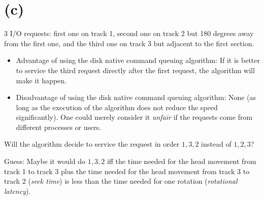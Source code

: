 \documentclass{article}
\begin{document}
\section*{(c)}
3 I/O requests: first one on track 1, second one on track 2 but 180 degrees away from the first one, and the third one on track 3 but adjacent to the first section.
\begin{itemize}
\item Advantage of using the disk native command queuing algorithm: If it is better to service the third request directly after the first request, the algorithm will make it happen.
\item Disadvantage of using the disk native command queuing algorithm: None (as long as the execution of the algorithm does not reduce the speed significantly). One could merely consider it \emph{unfair} if the requests come from different processes or users.
\end{itemize}
Will the algorithm decide to service the request in order $1, 3, 2$ instead of $1, 2, 3$?

Guess: Maybe it would do $1, 3, 2$ iff the time needed for the head movement from track 1 to track 3 plus the time needed for the head movement from track 3 to track 2 (\emph{seek time}) is less than the time needed for one rotation (\emph{rotational latency}).
\end{document}
